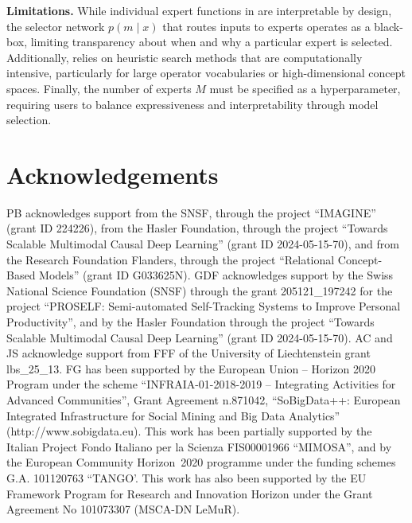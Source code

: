 \documentclass{article}
\theoremstyle{plain}
\theoremstyle{definition}
\theoremstyle{remark}
\newcommand{\mypar}[1]{\noindent\textbf{#1}}
\begin{document}
\mypar{Limitations.} While individual expert functions in \classacro{} are interpretable by design, the selector network $p(m \mid x)$ that routes inputs to experts operates as a black-box, limiting transparency about when and why a particular expert is selected. Additionally, \symbolicacro{} relies on heuristic search methods that are computationally intensive, particularly for large operator vocabularies or high-dimensional concept spaces. Finally, the number of experts $M$ must be specified as a hyperparameter, requiring users to balance expressiveness and interpretability through model selection.



\section*{Acknowledgements}

PB acknowledges support from the SNSF, through the project ``IMAGINE'' (grant ID 224226), from the Hasler Foundation, through the project ``Towards Scalable Multimodal Causal Deep Learning'' (grant ID 2024-05-15-70), 
and from the Research Foundation Flanders, through the project ``Relational Concept-Based Models'' (grant ID G033625N). 
GDF acknowledges support by the Swiss National Science Foundation (SNSF) through the grant 205121\_197242 for the project “PROSELF: Semi-automated Self-Tracking Systems to Improve Personal Productivity”, and by the Hasler Foundation through the project ``Towards Scalable Multimodal Causal Deep Learning'' (grant ID 2024-05-15-70). 
AC and JS acknowledge support from FFF of the University of Liechtenstein grant lbs\_25\_13.
FG has been supported by the European Union – Horizon 2020 Program under the scheme “INFRAIA-01-2018-2019 – Integrating Activities for Advanced Communities”, Grant Agreement n.871042, “SoBigData++: European Integrated Infrastructure for Social Mining and Big Data Analytics” (http://www.sobigdata.eu).
This work has been partially supported by the Italian Project Fondo Italiano per la Scienza FIS00001966 ``MIMOSA'', and by the European Community Horizon~2020 programme under the funding schemes G.A. 101120763 ``TANGO'.
This work has also been supported by the EU Framework Program for Research and Innovation Horizon under the Grant Agreement No 101073307 (MSCA-DN LeMuR).
\end{document}
